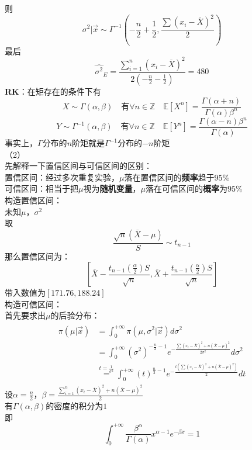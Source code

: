 \documentclass[UTF8,openany]{book}
\begin{document}
	则
	\[
	\sigma^2|\vec{x} \sim \Gamma^{-1}(-\frac{n}{2}+\frac{1}{2},\frac{\sum (x_i-\overline{X})^2}{2})
	\]
	最后
	\[
	\hat{\sigma^2}_{E}=\frac{\sum\limits_{i=1}^{n} (x_i-\overline{X})^2}{2(-\frac{n}{2}-\frac{1}{2})}=480
	\]
	\textbf{RK}：在矩存在的条件下有\\
	\[
	X \sim \Gamma(\alpha,\beta) \quad \text{有} \forall n \in \mathbb{Z} \quad \mathbb{E}[X^n]=\frac{\Gamma(\alpha+n)}{\Gamma(\alpha)\beta^n}
	\]
	\[
	Y \sim \Gamma^{-1}(\alpha,\beta) \quad \text{有} \forall n \in \mathbb{Z} \quad \mathbb{E}[Y^n]=\frac{\Gamma(\alpha-n)\beta^n}{\Gamma(\alpha)}
	\]
	事实上，$\Gamma$分布的$n$阶矩就是$\Gamma^{-1}$分布的$-n$阶矩\\
	（2）\\
	先解释一下置信区间与可信区间的区别：\\
	置信区间：经过多次重复实验，$\mu$落在置信区间的\textbf{频率}趋于$95\%$\\
	可信区间：相当于把$\mu$视为\textbf{随机变量}，$\mu$落在可信区间的\textbf{概率}为$95\%$\\
	构造置信区间：\\
	未知$\mu$，$\sigma^2$\\
	取\\
	\[
	\frac{\sqrt{n}(\overline{X}-\mu)}{S} \sim t_{n-1}
	\]
	那么置信区间为：
	\[
	[\overline{X}-\frac{t_{n-1}(\frac{\alpha}{2})S}{\sqrt{n}},\overline{X}+\frac{t_{n-1}(\frac{\alpha}{2})S}{\sqrt{n}}]
	\]
	带入数值为$[171.76,188.24]$\\
	构造可信区间：\\
	首先要求出$\mu$的后验分布：\\
	\begin{gather}
		\begin{aligned}
			\pi(\mu|\vec{x})&=\int_{0}^{+\infty} \pi(\mu,\sigma^2|\vec{x})d\sigma^2\\
			&=\int_{0}^{+\infty}(\sigma^2)^{-\frac{n}{2}-1}e^{-\frac{\sum (x_i-\overline{X})^2 +n(\overline{X}-\mu)^2}{2\sigma^2}}d\sigma^2\\
			&\overset{t=\frac{1}{\sigma^2}}=\int_{0}^{+\infty}(t)^{\frac{n}{2}-1}e^{-\frac{t(\sum (x_i-\overline{X})^2 +n(\overline{X}-\mu)^2)}{2}}dt
		\end{aligned}
	\end{gather}
	设$\alpha=\frac{n}{2}$，$\beta=\frac{\sum_{i=1}^n (x_i-\overline{X})^2 +n(\overline{X}-\mu)^2}{2}$\\
	有$\Gamma(\alpha,\beta)$的密度的积分为$1$\\
	即\\
	\[
	\int_{0}^{+\infty}\frac{\beta^{\alpha}}{\Gamma(\alpha)}x^{\alpha-1}e^{-\beta x}=1
	\]
\end{document}
